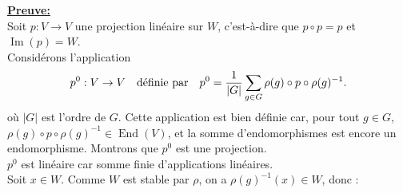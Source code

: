 \documentclass[a4paper, 14pt]{report}
\begin{document}
\begin{onehalfspace}
{\textbf{\underline{Preuve:}}\\
Soit \( p : V \to V \) une projection linéaire sur \( W \), c’est-à-dire que \( p \circ p = p \) et \( \operatorname{Im}(p) = W \).\\
Considérons l'application
\[
p^0 : V \to V \quad \text{définie par} \quad  \text{\(	p^0 = \frac{1}{|G|} \sum_{g \in G} \rho(g) \circ p \circ \rho(g)^{-1}.\)} 
\]
où $|G|$ est l'ordre de $G$. Cette application est bien définie car, pour tout \( g \in G \), \( \rho(g) \circ p \circ \rho(g)^{-1} \in \operatorname{End}(V) \), et la somme d'endomorphismes est encore un endomorphisme. 
Montrons que $p^0$ est une projection.\\
$p^0$ est linéaire car somme finie d'applications linéaires.\\
Soit $x \in W$. Comme $W$ est stable par $\rho$, on a \( \rho(g)^{-1}(x) \in W \), donc :

}
\end{onehalfspace}
\end{document}
